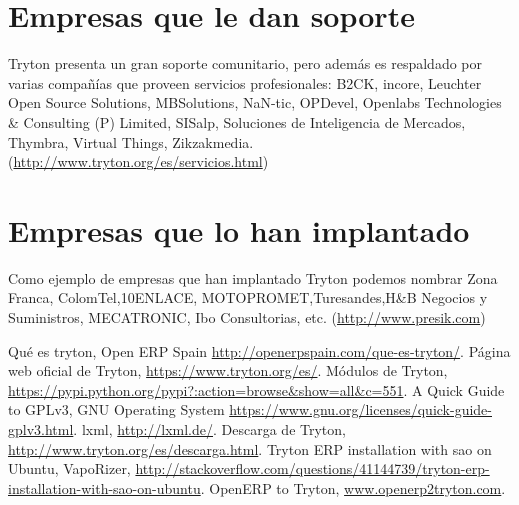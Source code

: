 \documentclass{article}
\begin{document}

\section{Empresas que le dan soporte}

Tryton presenta un gran soporte comunitario, pero además es respaldado por varias compañías que proveen servicios profesionales:
B2CK, incore, Leuchter Open Source Solutions, MBSolutions, NaN-tic, OPDevel, Openlabs Technologies  \& Consulting (P) Limited, SISalp, Soluciones de Inteligencia de Mercados, Thymbra,
Virtual Things, Zikzakmedia.(\url{http://www.tryton.org/es/servicios.html})


\section{Empresas que lo han implantado}
Como ejemplo de empresas que han implantado Tryton podemos nombrar Zona Franca, ColomTel,10ENLACE, MOTOPROMET,Turesandes,H\&B Negocios y Suministros, MECATRONIC, Ibo Consultorias, etc.
(\url{http://www.presik.com})

\begin{thebibliography}{99}
 Qué es tryton, Open ERP Spain \url{http://openerpspain.com/que-es-tryton/}.
 Página web oficial de Tryton, \url{https://www.tryton.org/es/}.
 Módulos de Tryton, \url{https://pypi.python.org/pypi?:action=browse&show=all&c=551}.
 A Quick Guide to GPLv3, GNU Operating System \url{https://www.gnu.org/licenses/quick-guide-gplv3.html}.
 lxml, \url{http://lxml.de/}.
 Descarga de Tryton, \url{http://www.tryton.org/es/descarga.html}.
 Tryton ERP installation with sao on Ubuntu, VapoRizer, \url{http://stackoverflow.com/questions/41144739/tryton-erp-installation-with-sao-on-ubuntu}.
 OpenERP to Tryton, \url{www.openerp2tryton.com}.

\end{thebibliography}
\end{document}
